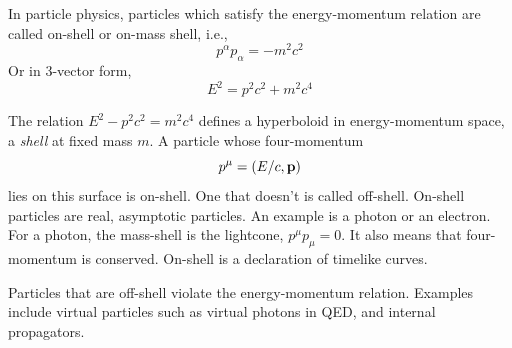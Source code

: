 		
			\begin{remark}
				In particle physics, particles which satisfy the energy-momentum relation are 
				called on-shell or on-mass shell, i.e.,
				\[
					p^\alpha p_\alpha = -m^2 c^2
				\]
				Or in 3-vector form, 
				\[
					E^2 = p^2 c^2 + m^2 c^4
				\]

				The relation $E^2 - p^2 c^2 = m^2 c^4$ defines a hyperboloid
				in energy-momentum space, a \textit{shell} at fixed mass $m$.
				A particle whose four-momentum
				\[
					p^\mu = (E/c, \vb{p})
				\]
				lies on this surface is on-shell. One that doesn't is called 
				off-shell. On-shell particles are real, asymptotic particles.
				An example is a photon or an electron. For a photon, the 
				mass-shell is the lightcone, $p^\mu p_\mu = 0$. It also means 
				that four-momentum is conserved. On-shell is a declaration of 
				timelike curves.
				
				\hspace{1em}Particles that are off-shell violate the energy-momentum
				relation. Examples include virtual particles such as virtual
				photons in QED, and internal propagators.
			\end{remark}

		
